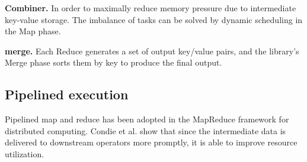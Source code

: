 
%
{\bf Combiner.}
In order to maximally reduce memory pressure due to intermediate key-value
storage.%
The imbalance of tasks can be solved by dynamic scheduling in the Map phase. 

{\bf merge.}
Each Reduce generates a set of output key/value
pairs, and the library’s Merge phase sorts them by key to
produce the final output. 

\subsection{Pipelined execution}
Pipelined map and reduce has been adopted 
in the MapReduce framework for distributed computing\cite{Condie2010MapReduce,}. 
Condie et al. show that since the intermediate data is delivered to
downstream operators more promptly, 
it is able to improve resource utilization.

